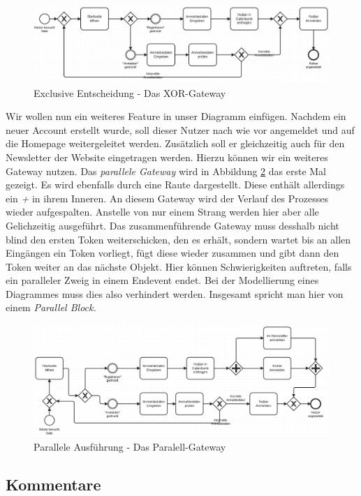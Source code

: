 \begin{figure}
\centering
\includegraphics[scale=0.5]{Figures/Beispiel5}
\decoRule
\caption[XOR-Gateway]{Exclusive Entscheidung - Das XOR-Gateway}
\label{XOR}
\end{figure}Wir wollen nun ein weiteres Feature in unser Diagramm einfügen. Nachdem ein neuer Account erstellt wurde, soll dieser Nutzer nach wie vor angemeldet und auf die Homepage weitergeleitet werden. Zusätzlich soll er gleichzeitig auch für den Newsletter der Website eingetragen werden. Hierzu können wir ein weiteres Gateway nutzen. Das \textit{parallele Gateway} wird in Abbildung \ref{parallel} das erste Mal gezeigt. Es wird ebenfalls durch eine Raute dargestellt. Diese enthält allerdings ein \textit{+} in ihrem Inneren. An diesem Gateway wird der Verlauf des Prozesses wieder aufgespalten. Anstelle von nur einem Strang werden hier aber alle Gelichzeitig ausgeführt. Das zusammenführende Gateway muss desshalb nicht blind den ersten Token weiterschicken, den es erhält, sondern wartet bis an allen Eingängen ein Token vorliegt, fügt diese wieder zusammen und gibt dann den Token weiter an das nächste Objekt. Hier können Schwierigkeiten auftreten, falls ein paralleler Zweig in einem Endevent endet. Bei der Modellierung eines Diagrammes muss dies also verhindert werden. Insgesamt spricht man hier von einem \textit{Parallel Block.}\\
\begin{figure}
\centering
\includegraphics[scale=0.5]{Figures/Beispiel6}
\decoRule
\caption[Paralell-Gateway]{Parallele Ausführung - Das Paralell-Gateway}
\label{parallel}
\end{figure}
\subsection{Kommentare}

